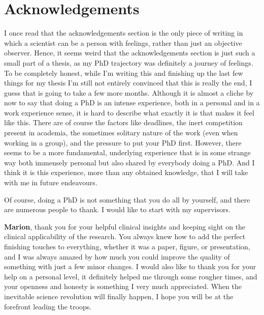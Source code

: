 \chapter{Acknowledgements}
\begin{ChapterAbstractNoTitle}
\end{ChapterAbstractNoTitle}

I once read that the acknowledgements section is the only piece of writing in which a scientist can be a person with feelings, rather than just an objective observer.
Hence, it seems weird that the acknowledgements section is just such a small part of a thesis, as my PhD trajectory was definitely a journey of feelings.
To be completely honest, while I'm writing this and finishing up the last few things for my thesis I'm still not entirely convinced that this is really the end, I guess that is going to take a few more months.
Although it is almost a cliche by now to say that doing a PhD is an intense experience, both in a personal and in a work experience sense, it is hard to describe what exactly it is that makes it feel like this.
There are of course the factors like deadlines, the inert competition present in academia, the sometimes solitary nature of the work (even when working in a group), and the pressure to put your PhD first.
However, there seems to be a more fundamental, underlying experience that is in some strange way both immensely personal but also shared by everybody doing a PhD.
And I think it is this experience, more than any obtained knowledge, that I will take with me in future endeavours.

Of course, doing a PhD is not something that you do all by yourself, and there are numerous people to thank.
I would like to start with my supervisors.

\textbf{Marion}, thank you for your helpful clinical insights and keeping sight on the clinical applicability of the research.
You always knew how to add the perfect finishing touches to everything, whether it was a paper, figure, or presentation, and I was always amazed by how much you could improve the quality of something with just a few minor changes.
I would also like to thank you for your help on a personal level, it definitely helped me through some rougher times, and your openness and honesty is something I very much appreciated.
When the inevitable science revolution will finally happen, I hope you will be at the forefront leading the troops.

